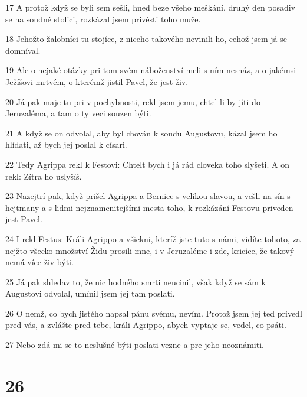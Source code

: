 \par 17 A protož když se byli sem sešli, hned beze všeho meškání, druhý den posadiv se na soudné stolici, rozkázal jsem privésti toho muže.
\par 18 Jehožto žalobníci tu stojíce, z niceho takového nevinili ho, cehož jsem já se domníval.
\par 19 Ale o nejaké otázky pri tom svém náboženství meli s ním nesnáz, a o jakémsi Ježíšovi mrtvém, o kterémž jistil Pavel, že jest živ.
\par 20 Já pak maje tu pri v pochybnosti, rekl jsem jemu, chtel-li by jíti do Jeruzaléma, a tam o ty veci souzen býti.
\par 21 A když se on odvolal, aby byl chován k soudu Augustovu, kázal jsem ho hlídati, až bych jej poslal k císari.
\par 22 Tedy Agrippa rekl k Festovi: Chtelt bych i já rád cloveka toho slyšeti. A on rekl: Zítra ho uslyšíš.
\par 23 Nazejtrí pak, když prišel Agrippa a Bernice s velikou slavou, a vešli na sín s hejtmany a s lidmi nejznamenitejšími mesta toho, k rozkázání Festovu priveden jest Pavel.
\par 24 I rekl Festus: Králi Agrippo a všickni, kteríž jste tuto s námi, vidíte tohoto, za nejžto všecko množství Židu prosili mne, i v Jeruzaléme i zde, kricíce, že takový nemá více živ býti.
\par 25 Já pak shledav to, že nic hodného smrti neucinil, však když se sám k Augustovi odvolal, umínil jsem jej tam poslati.
\par 26 O nemž, co bych jistého napsal pánu svému, nevím. Protož jsem jej ted privedl pred vás, a zvlášte pred tebe, králi Agrippo, abych vyptaje se, vedel, co psáti.
\par 27 Nebo zdá mi se to neslušné býti poslati vezne a pre jeho neoznámiti.

\chapter{26}


